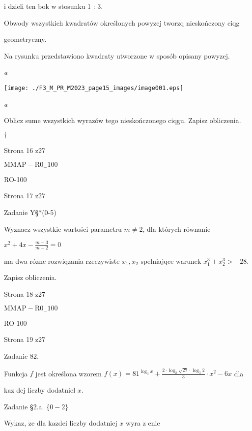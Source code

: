 \documentclass[a4paper,12pt]{article}
\begin{document}
i dzieli ten bok w stosunku 1 : 3.

Obwody wszystkich kwadratów określonych powyzej tworzq nieskończony ciqg

geometryczny.

Na rysunku przedstawiono kwadraty utworzone w sposób opisany powyzej.

{\it a}
\begin{center}
\texttt{[image: ./F3\_M\_PR\_M2023\_page15\_images/image001.eps]}
\end{center}
{\it a}

Oblicz sume wszystkich wyrazów tego nieskończonego ciqgu. Zapisz obliczenia.

$\dagger$

Strona 16 z27

$\mathrm{M}\mathrm{M}\mathrm{A}\mathrm{P}-\mathrm{R}0_{-}100$





RO-100

Strona 17 z27





Zadanie Y\S$*$(0-5)

Wyznacz wszystkie wartości parametru $m\neq 2$, dla których równanie

$x^{2}+4x-\displaystyle \frac{m-3}{m-2}=0$

ma dwa rózne rozwiqzania rzeczywiste $x_{1}, x_{2}$ spelniajqce warunek $x_{1}^{3}+x_{2}^{3}>-28.$

Zapisz obliczenia.

Strona 18 z27

$\mathrm{M}\mathrm{M}\mathrm{A}\mathrm{P}-\mathrm{R}0_{-}100$





RO-100

Strona 19 z27





Zadanie 82.

Funkcja $f$ jest określona wzorem $f(x)=81^{\log_{3}x}+\displaystyle \frac{2\cdot\log_{2}\sqrt{27}\cdot\log_{3}2}{3}\cdot x^{2}-6x$ dla

$\mathrm{k}\mathrm{a}\dot{\mathrm{z}}$ dej liczby dodatniel $x.$

Zadanie \S 2.a. $\{0-2\}$

Wykaz, $\dot{\mathrm{z}}\mathrm{e}$ dla $\mathrm{k}\mathrm{a}\dot{\mathrm{z}}\mathrm{d}\mathrm{e}\mathrm{i}$ liczby dodatniej $x$ wyra $\dot{\mathrm{z}}$ enie
\end{document}
